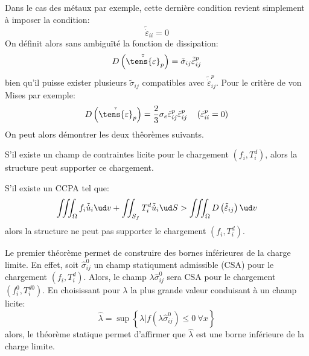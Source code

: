 Dans le cas des métaux par exemple, cette dernière condition revient simplement à imposer la condition: 
\begin{equation}
    \tilde{\dot{\varepsilon}}_{ii} = 0
    \label{eq:Ch10-055}
\end{equation}
On définit alors sans ambiguïté la fonction de dissipation: 
\begin{equation}
    D\left( \tilde{\dot{\tens{\varepsilon}}}_p \right) = \tilde{\sigma}_{ij} \tilde{\dot{\varepsilon}}_{ij}^p
    \label{eq:Ch10-056}
\end{equation}
bien qu'il puisse exister plusieurs $\tilde{\sigma}_{ij}$ compatibles avec $\tilde{\dot{\varepsilon}}_{ij}^p$.
Pour le critère de von Mises par exemple: 
\begin{equation}
    D\left( \tilde{\dot{\tens{\varepsilon}}}_p \right) = \frac{2}{3} \sigma_e \tilde{\varepsilon}_{ij}^p \tilde{\varepsilon}_{ij}^p \quad \left( \dot{\varepsilon}_{ii}^p = 0 \right)
    \label{eq:Ch10-057}
\end{equation}
On peut alors démontrer les deux thêorèmes suivants.
\begin{thmn}
    S'il existe un champ de contraintes licite pour le chargement $\left( f_i, T_i^d \right)$, alors la structure peut supporter ce chargement.
\end{thmn}
\begin{thmn}
    S'il existe un CCPA tel que: 
    \begin{equation}
        \iiint_{\Omega} f_i \tilde{\dot{u}}_i \ud v + \iint_{S_f} T_i^d \tilde{\dot{u}}_i \ud S > \iiint_{\Omega} D \left( \tilde{\dot{\varepsilon}}_{ij} \right) \ud v
        \label{eq:Ch10-058}
    \end{equation}
    alors la structure ne peut pas supporter le chargement $\left( f_i, T_i^d \right)$.
\end{thmn}
Le premier théorème permet de construire des bornes inférieures de la charge limite.
En effet, soit $\hat{\sigma}_{ij}^0$ un champ statiqument admissible (CSA) pour le chargement $\left( f_i, T_i^d \right)$.
Alors, le champ $\lambda \hat{\sigma}_{ij}^0$ sera CSA pour le chargement $\left( f^0_i, T_i^{d0} \right)$.
En choisissant pour $\lambda$ la plus grande valeur conduisant à un champ licite: 
\begin{equation}
    \hat{\lambda} = \sup \left\{ \lambda | f\left( \lambda \hat{\sigma}_{ij}^0 \right) \leq 0\ \forall x \right\}
    \label{eq:Ch10-059}
\end{equation}
alors, le théorème statique permet d'affirmer que $\hat{\lambda}$ est une borne inférieure de la charge limite. 

